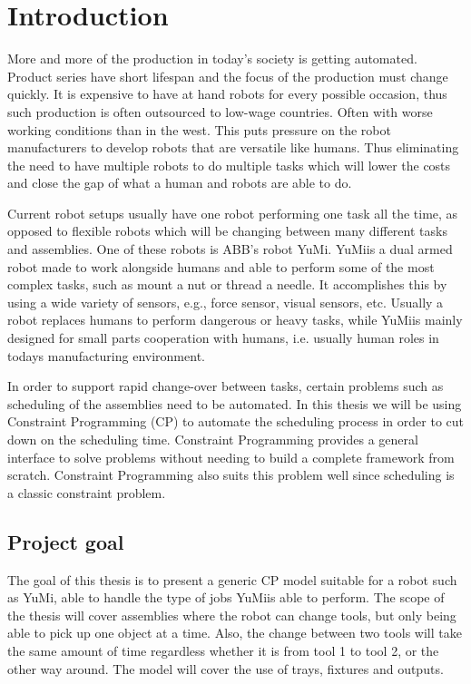\chapter{Introduction} 

More and more of the production in today's society is getting automated.
Product series have short lifespan and the focus of the production must change quickly. It is expensive to have at hand robots for every possible occasion, thus such production is often outsourced to low-wage countries. Often with worse working conditions than in the west. This puts pressure on the robot manufacturers to develop robots that are versatile like humans. Thus eliminating the need to have multiple robots to do multiple tasks which will lower the costs and close the gap of what a human and robots are able to do.

Current robot setups usually have one robot performing one task all the time, as opposed to flexible robots which will be changing between many different tasks and assemblies. One of these robots is ABB's robot YuMi\textsuperscript\textregistered. YuMi\textsuperscript\textregistered is a dual armed robot made to work alongside humans and able to perform some of the most complex tasks, such as mount a nut or thread a needle\cite{_yumi_}. It accomplishes this by using a wide variety of sensors, e.g., force sensor, visual sensors, etc. Usually a robot replaces humans to perform dangerous or heavy tasks, while YuMi\textsuperscript\textregistered is mainly designed for small parts cooperation with humans, i.e. usually human roles in todays manufacturing environment.

In order to support rapid change-over between tasks, certain problems such as scheduling of the assemblies need to be automated. In this thesis we will be using Constraint Programming (CP) to automate the scheduling process in order to cut down on the scheduling time. Constraint Programming provides a general interface to solve problems without needing to build a complete framework from scratch. Constraint Programming also suits this problem well since scheduling is a classic constraint problem.

\newpage

\section{Project goal}
The goal of this thesis is to present a generic CP model suitable for a robot such as YuMi\textsuperscript\textregistered, able to handle the type of jobs YuMi\textsuperscript\textregistered is able to perform. The scope of the thesis will cover assemblies where the robot can change tools, but only being able to pick up one object at a time. Also, the change between two tools will take the same amount of time regardless whether it is from tool 1 to tool 2, or the other way around. The model will cover the use of trays, fixtures and outputs.

